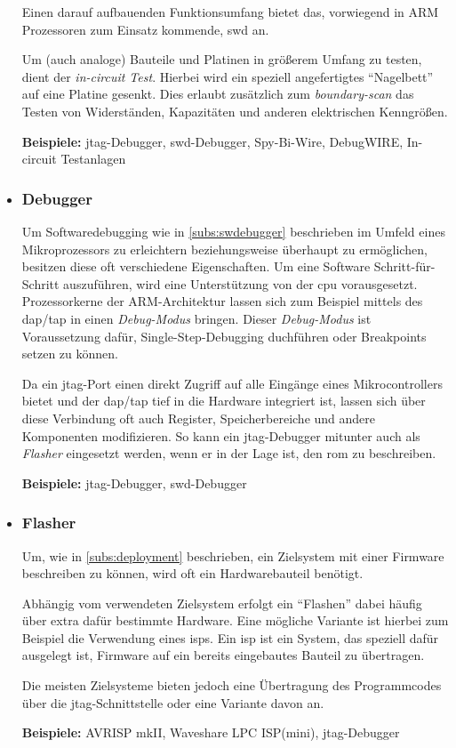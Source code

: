 \begin{itemize}
  Einen darauf aufbauenden Funktionsumfang bietet das, vorwiegend in ARM
  Prozessoren zum Einsatz kommende, \gls{swd}\cite{SWD} an.
  
  Um (auch analoge) Bauteile und Platinen in größerem Umfang zu testen, dient
  der \emph{in-circuit Test}. Hierbei wird ein speziell angefertigtes
  "`Nagelbett"' auf eine Platine gesenkt. Dies erlaubt zusätzlich zum
  \emph{boundary-scan} das Testen von Widerständen, Kapazitäten und anderen
  elektrischen Kenngrößen.
   
  \textbf{Beispiele:} \gls{jtag}-Debugger, \gls{swd}-Debugger, Spy-Bi-Wire,
  DebugWIRE, In-circuit Testanlagen
  \item \subsubsection*{Debugger}\label{subs:hwdebugger}  Um
  Softwaredebugging wie in \autoref{subs:swdebugger} beschrieben im Umfeld eines
  Mikroprozessors zu erleichtern beziehungsweise überhaupt zu ermöglichen,
  besitzen diese oft verschiedene Eigenschaften.
  Um eine Software Schritt-für-Schritt auszuführen, wird eine Unterstützung von
  der \gls{cpu} vorausgesetzt. Prozessorkerne der ARM-Architektur lassen sich
  zum Beispiel mittels des \gls{dap}/\gls{tap} in einen \emph{Debug-Modus}
  bringen. Dieser \emph{Debug-Modus} ist Voraussetzung dafür,
  Single-Step-Debugging duchführen oder Breakpoints setzen zu können.
  
  Da ein \gls{jtag}-Port einen direkt Zugriff auf alle Eingänge eines
  Mikrocontrollers bietet und der \gls{dap}/\gls{tap} tief in die Hardware
  integriert ist, lassen sich über diese Verbindung oft auch Register,
  Speicherbereiche und andere Komponenten modifizieren. So kann ein
  \gls{jtag}-Debugger mitunter auch als \emph{Flasher} eingesetzt werden, wenn
  er in der Lage ist, den \gls{rom} zu beschreiben.
  
  \textbf{Beispiele:} \gls{jtag}-Debugger, \gls{swd}-Debugger
  \item \subsubsection*{Flasher} Um, wie in \autoref{subs:deployment}
  beschrieben, ein Zielsystem mit einer Firmware beschreiben zu können, wird
  oft ein Hardwarebauteil benötigt.
  
  Abhängig vom verwendeten Zielsystem erfolgt ein "`Flashen"' dabei häufig über
  extra dafür bestimmte Hardware. Eine mögliche Variante ist hierbei zum
  Beispiel die Verwendung eines \glspl{isp}. Ein \gls{isp} ist ein System, das
  speziell dafür ausgelegt ist, Firmware auf ein bereits eingebautes Bauteil zu
  übertragen.
  
  Die meisten Zielsysteme bieten jedoch eine Übertragung des Programmcodes über
  die \gls{jtag}-Schnittstelle oder eine Variante davon an.

  \textbf{Beispiele:} AVRISP mkII, Waveshare LPC ISP(mini), \gls{jtag}-Debugger
\end{itemize}
